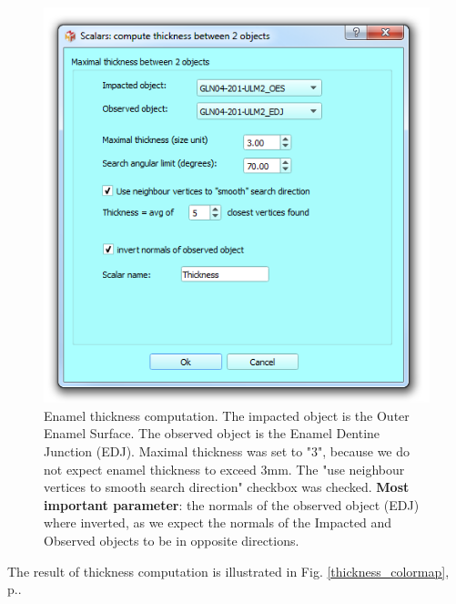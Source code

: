 \documentclass[12pt, a4paper]{book}
\begin{document}
\begin{figure}
  \centering
  \includegraphics[scale=0.5]{thickness_between.png}
\caption{Enamel thickness computation. The impacted object is the Outer Enamel Surface. The observed object is the Enamel Dentine Junction (EDJ). Maximal thickness was set to "3", because we do not expect enamel thickness to exceed 3mm. The "use neighbour vertices to smooth search direction" checkbox was checked. \textbf{Most important parameter}: the normals of the observed object (EDJ) where inverted, as we expect the normals of the Impacted and Observed objects to be in opposite directions.}	
\label{thickness_between}
 \end{figure}

The result of thickness computation is illustrated in Fig. \ref{thickness_colormap}, p.\pageref{thickness_colormap}. 
\end{document}
